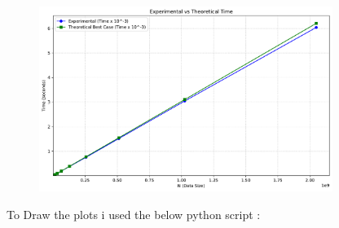 \begin{figure}[h!]
    \centering
    \includegraphics[width=0.85\textwidth]{Questions/Part1/plot.pdf}
    \label{fig:time_plot}
\end{figure}

\newpage

To Draw the plots i used the below python script :

\vspace{1cm}



